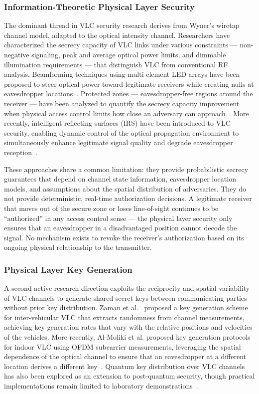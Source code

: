 \documentclass[conference]{IEEEtran}
\begin{document}
\subsubsection{Information-Theoretic Physical Layer Security}
The dominant thread in VLC security research derives from Wyner's wiretap channel model, adapted to the optical intensity channel. Researchers have characterized the secrecy capacity of VLC links under various constraints --- non-negative signaling, peak and average optical power limits, and dimmable illumination requirements --- that distinguish VLC from conventional RF analysis. Beamforming techniques using multi-element LED arrays have been proposed to steer optical power toward legitimate receivers while creating nulls at eavesdropper locations~\cite{arfaoui2020}. Protected zones --- eavesdropper-free regions around the receiver --- have been analyzed to quantify the secrecy capacity improvement when physical access control limits how close an adversary can approach~\cite{cho2018}. More recently, intelligent reflecting surfaces (IRS) have been introduced to VLC security, enabling dynamic control of the optical propagation environment to simultaneously enhance legitimate signal quality and degrade eavesdropper reception~\cite{irs_vlc2024}.

These approaches share a common limitation: they provide probabilistic secrecy guarantees that depend on channel state information, eavesdropper location models, and assumptions about the spatial distribution of adversaries. They do not provide deterministic, real-time authorization decisions. A legitimate receiver that moves out of the secure zone or loses line-of-sight continues to be ``authorized'' in any access control sense --- the physical layer security only ensures that an eavesdropper in a disadvantaged position cannot decode the signal. No mechanism exists to revoke the receiver's authorization based on its ongoing physical relationship to the transmitter.

\subsubsection{Physical Layer Key Generation}

A second active research direction exploits the reciprocity and spatial variability of VLC channels to generate shared secret keys between communicating parties without prior key distribution. Zaman et al.~\cite{almoliki2017} proposed a key generation scheme for inter-vehicular VLC that extracts randomness from channel measurements, achieving key generation rates that vary with the relative positions and velocities of the vehicles. More recently, Al-Moliki et al. proposed key generation protocols for indoor VLC using OFDM subcarrier measurements, leveraging the spatial dependence of the optical channel to ensure that an eavesdropper at a different location derives a different key~\cite{keygen_ofdm2017}. Quantum key distribution over VLC channels has also been explored as an extension to post-quantum security, though practical implementations remain limited to laboratory demonstrations~\cite{qkd_vlc2025}.
\end{document}

